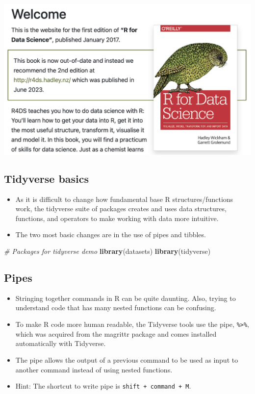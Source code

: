 \documentclass[
]{book}
\newenvironment{Shaded}{\begin{snugshade}}{\end{snugshade}}
\newcommand{\CommentTok}[1]{\textcolor[rgb]{0.56,0.35,0.01}{\textit{#1}}}
\newcommand{\FunctionTok}[1]{\textcolor[rgb]{0.13,0.29,0.53}{\textbf{#1}}}
\newcommand{\NormalTok}[1]{#1}
\providecommand{\tightlist}{%
  \setlength{\itemsep}{0pt}\setlength{\parskip}{0pt}}
\begin{document}
\includegraphics{./img/RforDS.png}

\subsection{Tidyverse basics}\label{tidyverse-basics}

\begin{itemize}
\tightlist
\item
  As it is difficult to change how fundamental base R structures/functions work, the tidyverse suite of packages creates and uses data structures, functions, and operators to make working with data more intuitive.
\item
  The two most basic changes are in the use of pipes and tibbles.
\end{itemize}

\begin{Shaded}
\begin{Highlighting}[]
\CommentTok{\# Packages for tidyverse demo}
\FunctionTok{library}\NormalTok{(datasets)}
\FunctionTok{library}\NormalTok{(tidyverse)}
\end{Highlighting}
\end{Shaded}

\subsection{Pipes}\label{pipes}

\begin{itemize}
\tightlist
\item
  Stringing together commands in R can be quite daunting. Also, trying to understand code that has many nested functions can be confusing.
\item
  To make R code more human readable, the Tidyverse tools use the pipe, \texttt{\%\textgreater{}\%}, which was acquired from the magrittr package and comes installed automatically with Tidyverse.
\item
  The pipe allows the output of a previous command to be used as input to another command instead
  of using nested functions.
\item
  Hint: The shortcut to write pipe is \texttt{shift\ +\ command\ +\ M}.
\end{itemize}
\end{document}
